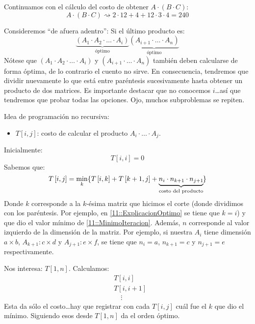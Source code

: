 \documentclass[english, spanish, fleqn, 10pt]{article}
\newcommand{\comillas}[1]{``#1''}
\numberwithin{equation}{section}
\newcommand{\nparentesis}[1]{\left( #1 \right)}
\newcommand{\ncorchetes}[1]{\left[ #1 \right]}
\theoremstyle{definition}
\begin{document}
Continuamos con el cálculo del costo de obtener $A\cdot \nparentesis{B\cdot C}$:
\begin{equation*}
A\cdot \nparentesis{B\cdot C}\rightsquigarrow 2\cdot 12+4+12\cdot 3\cdot 4 = 240
\end{equation*}

Consideremos \comillas{de afuera adentro}: Si el último producto es:
\begin{equation}\label{11::ExplicacionOptimo}
\underbrace{\nparentesis{A_1\cdot A_2\cdot \ldots \cdot A_i}}_{\text{óptimo}}\underbrace{\nparentesis{A_{i+1}\cdot \ldots \cdot A_n}}_{\text{óptimo}}
\end{equation}
Nótese que $\nparentesis{A_1\cdot A_2\cdot \ldots \cdot A_i}$ y $\nparentesis{A_{i+1}\cdot \ldots \cdot A_n}$ también deben calcularse de forma óptima, de lo contrario el cuento no sirve. En consecuencia, tendremos que dividir nuevamente lo que está entre paréntesis sucesivamente hasta obtener un producto de dos matrices. Es importante destacar que no conocemos $i$\ldots  así que tendremos que probar todas las opciones. Ojo, muchos subproblemas se repiten.

Idea de programación no recursiva:
\begin{itemize}
	\item $T\ncorchetes{i, j}$: costo de calcular el producto $A_i\cdot \ldots \cdot A_j$.
\end{itemize}
Inicialmente:
\begin{equation*}
T\ncorchetes{i, i}=0
\end{equation*}
Sabemos que:
\begin{equation}\label{11::MinimoIteracion}
T\ncorchetes{i, j}=\min_k\{T\ncorchetes{i, k}+T\ncorchetes{k+1, j}+\underbrace{n_i\cdot n_{k+1}\cdot n_{j+1}}_{\text{costo del producto}}\hspace{-0.2mm}\}
\end{equation}
Donde $k$ corresponde a la $k$-ésima matriz que hicimos el corte (donde dividimos con los paréntesis. Por ejemplo, en \eqref{11::ExplicacionOptimo} se tiene que $k=i$) y que dio el valor mínimo de \eqref{11::MinimoIteracion}. Además, $n$ corresponde al valor izquierdo de la dimensión de la matriz. Por ejemplo, si nuestra $A_i$ tiene dimensión $a\times b$, $A_{k+1}:c\times d$ y $A_{j+1}:e\times f$, se tiene que $n_i=a$, $n_{k+1}=c$ y $n_{j+1}=e$ respectivamente.

Nos interesa: $T\ncorchetes{1, n}$. Calculamos:
\begin{align*}
&T\ncorchetes{i, i}\\
&T\ncorchetes{i, i+1}\\
&\quad\vdots
\end{align*}
Esta da sólo el costo\ldots hay que registrar con cada $T\ncorchetes{i, j}$ cuál fue el $k$ que dio el mínimo. Siguiendo esos desde $T\ncorchetes{1, n}$ da el orden óptimo.
\end{document}
